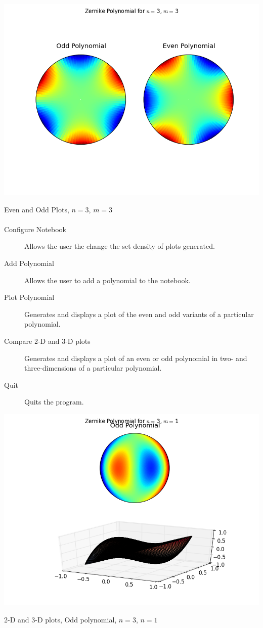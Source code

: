 \documentclass{tufte-handout}
\begin{document}
\begin{marginfigure}%
  \includegraphics[width=\linewidth]{img/3-3.png}
  \caption{Even and Odd Plots, $n=3$, $m=3$}
\end{marginfigure}

\paragraph{}
\begin{description}
\item[Configure Notebook] Allows the user the change the set density of plots generated.
\item[Add Polynomial] Allows the user to add a polynomial to the notebook.
\item[Plot Polynomial] Generates and displays a plot of the even and odd variants of a particular polynomial.
\item[Compare 2-D and 3-D plots] Generates and displays a plot of an even or odd polynomial in two- and three-dimensions of a particular polynomial.
\item[Quit] Quits the program.
\end{description}

\begin{marginfigure}[-40mm]%
  \includegraphics[width=\linewidth]{img/3-1-compare-odd.png}
  \caption{2-D and 3-D plots, Odd polynomial, $n=3$, $n=1$}
\end{marginfigure}
\end{document}
